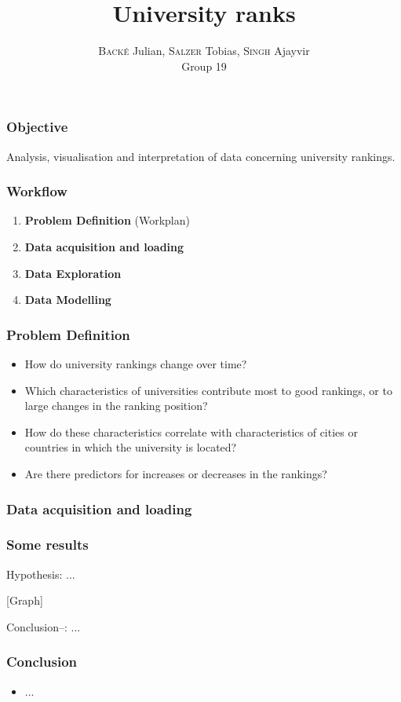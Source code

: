 \documentclass[mathserif,notheorems,11pt]{beamer}
\title{\textbf{University ranks}}
\author{\textsc{Back\'{e}} Julian, \textsc{Salzer} Tobias, \textsc{Singh} Ajayvir\\
Group 19}
\date{}
\begin{document}
\maketitle
\linespread{1.2}


\begin{frame} 
\frametitle{Objective}
Analysis, visualisation and interpretation of data concerning university rankings.
\end{frame}

\begin{frame} 
\frametitle{Workflow}

\begin{enumerate}
\item \textbf{Problem Definition} (Workplan)

\item \textbf{Data acquisition and loading}

\item \textbf{Data Exploration}

\item \textbf{Data Modelling}
\end{enumerate}

\end{frame}

\begin{frame} 
\frametitle{Problem Definition}

\begin{itemize}
	\item How do university rankings change over time? 
	
	\item Which characteristics of universities contribute most to good rankings, or to large changes in the ranking position? 
	
	\item How do these characteristics correlate with characteristics of cities or countries in which the university is
	located? 
	
	\item Are there predictors for increases or decreases in the rankings?
\end{itemize}

\end{frame}

\begin{frame} 
\frametitle{Data acquisition and loading}

\end{frame}

\begin{frame} 
\frametitle{Some results}

Hypothesis: ...

[Graph]

Conclusion--: ...
\end{frame}

\begin{frame} 
\frametitle{Conclusion}
\begin{itemize}
\item ...

\end{itemize}


\end{frame}
\end{document}
